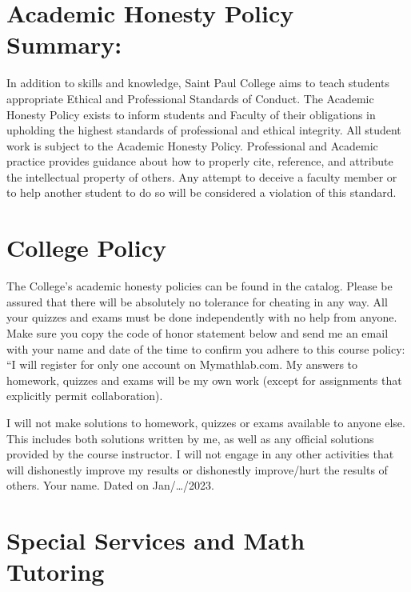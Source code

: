 \documentclass[]{article}
\begin{document}
\hypertarget{academic-honesty-policy-summary}{%
\section{Academic Honesty Policy
Summary:}\label{academic-honesty-policy-summary}}

In addition to skills and knowledge, Saint Paul College aims to teach
students appropriate Ethical and Professional Standards of Conduct. The
Academic Honesty Policy exists to inform students and Faculty of their
obligations in upholding the highest standards of professional and
ethical integrity. All student work is subject to the Academic Honesty
Policy. Professional and Academic practice provides guidance about how
to properly cite, reference, and attribute the intellectual property of
others. Any attempt to deceive a faculty member or to help another
student to do so will be considered a violation of this standard.

\hypertarget{college-policy}{%
\section{College Policy}\label{college-policy}}

The College's academic honesty policies can be found in the catalog.
Please be assured that there will be absolutely no tolerance for
cheating in any way. All your quizzes and exams must be done
independently with no help from anyone. Make sure you copy the code of
honor statement below and send me an email with your name and date of
the time to confirm you adhere to this course policy: ``I will register
for only one account on Mymathlab.com. My answers to homework, quizzes
and exams will be my own work (except for assignments that explicitly
permit collaboration).

I will not make solutions to homework, quizzes or exams available to
anyone else. This includes both solutions written by me, as well as any
official solutions provided by the course instructor. I will not engage
in any other activities that will dishonestly improve my results or
dishonestly improve/hurt the results of others. Your name. Dated on
Jan/\ldots/2023.

\hypertarget{special-services-and-math-tutoring}{%
\section{Special Services and Math
Tutoring}\label{special-services-and-math-tutoring}}
\end{document}
